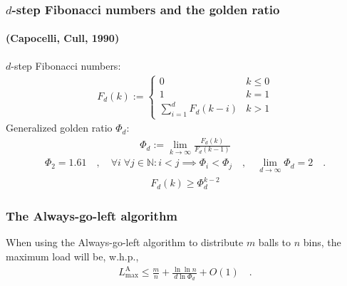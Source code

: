 \documentclass[serif,professionalfonts]{beamer}
\newcommand\load{L_{\mathrm{max}}}
\newcommand\loadAgl{\load^{\mathrm{A}}}
\begin{document}
\begin{frame}
\frametitle{$d$-step Fibonacci numbers and the golden ratio}
\framesubtitle{(Capocelli, Cull, 1990)}

$d$-step Fibonacci numbers:
\begin{align*}
F_d(k) := \begin{cases}
                0               & k \leq 0\\
                1               & k = 1\\
                \sum_{i=1}^{d}F_d(k-i) & k > 1
            \end{cases}
\end{align*}
Generalized golden ratio $\Phi_d$:
\begin{align*}
\Phi_d := \lim_{k \rightarrow \infty} \frac{F_d(k)}{F_d(k-1)}
\end{align*}
\begin{align*}
\Phi_2 = 1.61 \quad , \quad \forall i\; \forall j \in \mathbb{N}: i < j \implies \Phi_i < \Phi_j \quad , \quad \lim_{d\rightarrow \infty} \Phi_d = 2 \quad .
\end{align*}
\begin{align*}
F_d(k) \geq \Phi_d^{k-2}
\end{align*}
\end{frame}

\newcommand\theoremVocking{
\begin{theorem}[V\"ocking, 2003]
When using the \alert{Always-go-left} algorithm to distribute $m$ balls to $n$ bins, the maximum load will be, w.h.p.,
\begin{align*}
\loadAgl \leq \frac{m}{n} + \frac{\ln \ln n}{d \ln \Phi_d} + O(1) \quad .
\end{align*}
\end{theorem}
}

\begin{frame}[shrink]
\frametitle{The Always-go-left algorithm}
\aglAlgorithm
\theoremVocking
\end{frame}
\end{document}
